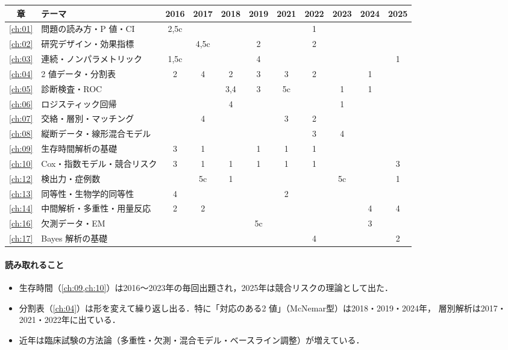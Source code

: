 \begin{center}\small
\setlength{\tabcolsep}{3.2pt}
\begin{tabular}{@{}clccccccccc@{}}
\toprule
章 & テーマ & 2016 & 2017 & 2018 & 2019 & 2021 & 2022 & 2023 & 2024 & 2025\\
\midrule
\ref{ch:01} & 問題の読み方・P 値・CI & 2,5c & & & & & 1 & & & \\
\ref{ch:02} & 研究デザイン・効果指標 & & 4,5c & & 2 & & 2 & & & \\
\ref{ch:03} & 連続・ノンパラメトリック & 1,5c & & & 4 & & & & & 1\\
\ref{ch:04} & 2 値データ・分割表 & 2 & 4 & 2 & 3 & 3 & 2 & & 1 & \\
\ref{ch:05} & 診断検査・ROC & & & 3,4 & 3 & 5c & & 1 & 1 & \\
\ref{ch:06} & ロジスティック回帰 & & & 4 & & & & 1 & & \\
\ref{ch:07} & 交絡・層別・マッチング & & 4 & & & 3 & 2 & & & \\
\ref{ch:08} & 縦断データ・線形混合モデル & & & & & & 3 & 4 & & \\
\ref{ch:09} & 生存時間解析の基礎 & 3 & 1 & & 1 & 1 & 1 & & & \\
\ref{ch:10} & Cox・指数モデル・競合リスク & 3 & 1 & 1 & 1 & 1 & 1 & & & 3\\
\ref{ch:12} & 検出力・症例数 & & 5c & 1 & & & & 5c & & 1\\
\ref{ch:13} & 同等性・生物学的同等性 & 4 & & & & 2 & & & & \\
\ref{ch:14} & 中間解析・多重性・用量反応 & 2 & 2 & & & & & & 4 & 4\\
\ref{ch:16} & 欠測データ・EM & & & & 5c & & & & 3 & \\
\ref{ch:17} & Bayes 解析の基礎 & & & & & & 4 & & & 2\\
\bottomrule
\end{tabular}
\end{center}

\paragraph{読み取れること}
\begin{itemize}
\item 生存時間（\cref{ch:09,ch:10}）は2016〜2023年の毎回出題され，2025年は競合リスクの理論として出た．
\item 分割表（\cref{ch:04}）は形を変えて繰り返し出る．特に「対応のある2 値」（McNemar型）は2018・2019・2024年，
      層別解析は2017・2021・2022年に出ている．
\item 近年は臨床試験の方法論（多重性・欠測・混合モデル・ベースライン調整）が増えている．
\end{itemize}

